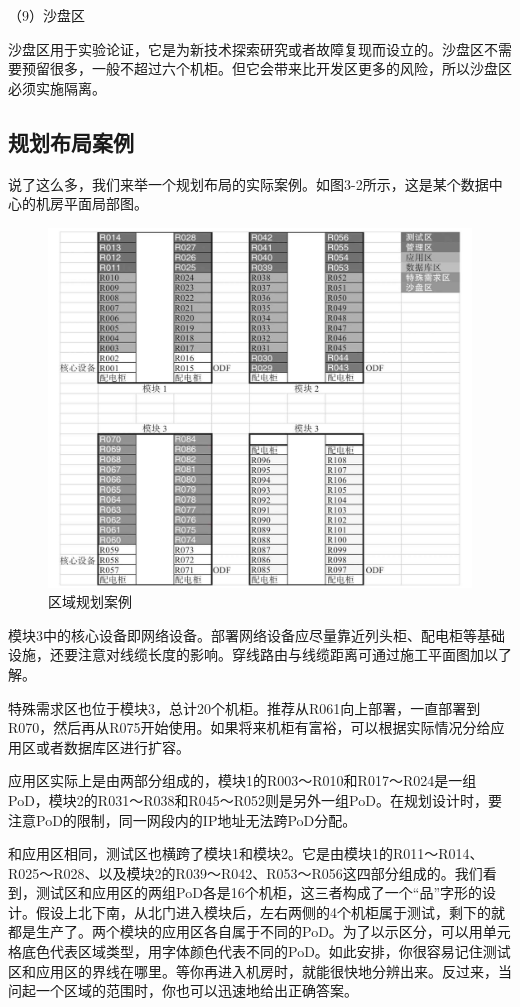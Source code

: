 \documentclass[12pt,UTF8]{ctexbook}
\begin{document}
（9）沙盘区

沙盘区用于实验论证，它是为新技术探索研究或者故障复现而设立的。沙盘区不需要预留很多，一般不超过六个机柜。但它会带来比开发区更多的风险，所以沙盘区必须实施隔离。

\subsection{规划布局案例}

说了这么多，我们来举一个规划布局的实际案例。如图3-2所示，这是某个数据中心的机房平面局部图。

\begin{figure}[htbp]
	\centering
	\includegraphics[width=1\linewidth]{6}
	\caption{区域规划案例}
	\label{fig:1}
\end{figure}

模块3中的核心设备即网络设备。部署网络设备应尽量靠近列头柜、配电柜等基础设施，还要注意对线缆长度的影响。穿线路由与线缆距离可通过施工平面图加以了解。

特殊需求区也位于模块3，总计20个机柜。推荐从R061向上部署，一直部署到R070，然后再从R075开始使用。如果将来机柜有富裕，可以根据实际情况分给应用区或者数据库区进行扩容。

应用区实际上是由两部分组成的，模块1的R003～R010和R017～R024是一组PoD，模块2的R031～R038和R045～R052则是另外一组PoD。在规划设计时，要注意PoD的限制，同一网段内的IP地址无法跨PoD分配。

和应用区相同，测试区也横跨了模块1和模块2。它是由模块1的R011～R014、R025～R028、以及模块2的R039～R042、R053～R056这四部分组成的。我们看到，测试区和应用区的两组PoD各是16个机柜，这三者构成了一个“品”字形的设计。假设上北下南，从北门进入模块后，左右两侧的4个机柜属于测试，剩下的就都是生产了。两个模块的应用区各自属于不同的PoD。为了以示区分，可以用单元格底色代表区域类型，用字体颜色代表不同的PoD。如此安排，你很容易记住测试区和应用区的界线在哪里。等你再进入机房时，就能很快地分辨出来。反过来，当问起一个区域的范围时，你也可以迅速地给出正确答案。
\end{document}
